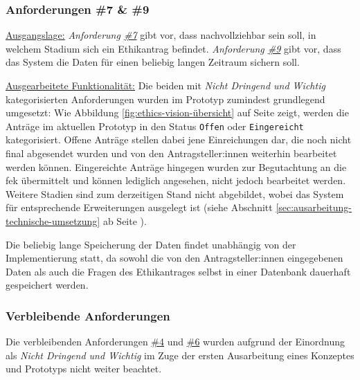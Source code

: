 \documentclass[a4paper,12pt,twoside]{scrreprt}
\begin{document}
\subsubsection*{Anforderungen \#7 \& \#9}
\label{sub-sub-sec:umgesetzte-funktionalitäten-anforderung-7-9}

\noindent\underline{Ausgangslage:} \textit{Anforderung \hyperref[sub-sub-sec:abgeleitete-anforderungen-nach-einreichung]{\#7}} gibt vor, dass nachvollziehbar sein soll, in welchem Stadium sich ein Ethikantrag befindet. \textit{Anforderung \hyperref[sub-sub-sec:abgeleitete-anforderungen-nach-einreichung]{\#9}} gibt vor, dass das System die Daten für einen beliebig langen Zeitraum sichern soll.

\medskip

\noindent\underline{Ausgearbeitete Funktionalität:} Die beiden mit \textit{Nicht Dringend und Wichtig} kategorisierten Anforderungen wurden im Prototyp zumindest grundlegend umgesetzt: Wie Abbildung \ref{fig:ethics-vision-übersicht} auf Seite \pageref{fig:ethics-vision-übersicht} zeigt, werden die Anträge im aktuellen Prototyp in den Status \texttt{Offen} oder \texttt{Eingereicht} kategorisiert. Offene Anträge stellen dabei jene Einreichungen dar, die noch nicht final abgesendet wurden und von den Antragsteller:innen weiterhin bearbeitet werden können. Eingereichte Anträge hingegen wurden zur Begutachtung an die \ac{fek} übermittelt und können lediglich angesehen, nicht jedoch bearbeitet werden. Weitere Stadien sind zum derzeitigen Stand nicht abgebildet, wobei das System für entsprechende Erweiterungen ausgelegt ist (siehe Abschnitt \ref{sec:ausarbeitung-technische-umsetzung} ab Seite \pageref{sec:ausarbeitung-technische-umsetzung}).

Die beliebig lange Speicherung der Daten findet unabhängig von der Implementierung statt, da sowohl die von den Antragsteller:innen eingegebenen Daten als auch die Fragen des Ethikantrages selbst in einer Datenbank dauerhaft gespeichert werden.

\subsubsection*{Verbleibende Anforderungen}
\label{sub-sub-sec:umgesetzte-funktionalitäten-verbleibende-anforderungen}

Die verbleibenden Anforderungen \hyperref[sub-sub-sec:abgeleitete-anforderungen-während-erstellung-einreichung]{\#4} und \hyperref[sub-sub-sec:abgeleitete-anforderungen-während-erstellung-einreichung]{\#6} wurden aufgrund der Einordnung als \textit{Nicht Dringend und Wichtig} im Zuge der ersten Ausarbeitung eines Konzeptes und Prototyps nicht weiter beachtet.
\end{document}
